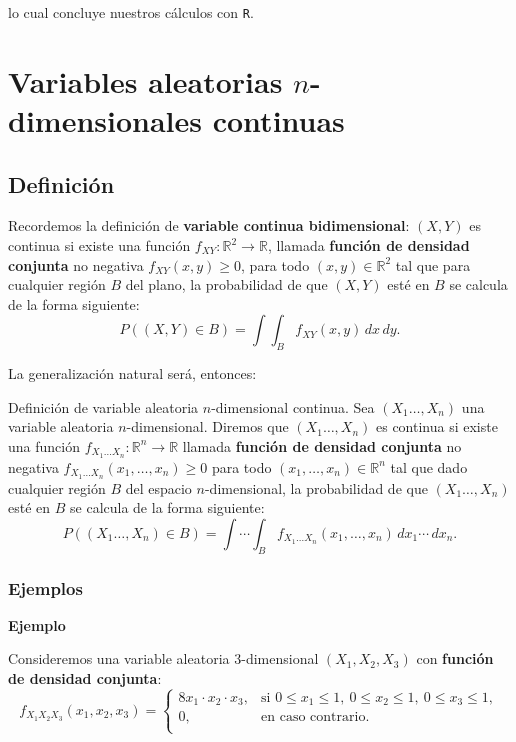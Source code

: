 \documentclass[]{book}
\begin{document}
lo cual concluye nuestros cálculos con \texttt{R}.

\hypertarget{variables-aleatorias-n-dimensionales-continuas}{%
\section{\texorpdfstring{Variables aleatorias \(n\)-dimensionales continuas}{Variables aleatorias n-dimensionales continuas}}\label{variables-aleatorias-n-dimensionales-continuas}}

\hypertarget{definiciuxf3n-7}{%
\subsection{Definición}\label{definiciuxf3n-7}}

Recordemos la definición de \textbf{variable continua bidimensional}: \((X,Y)\) es continua si existe una función \(f_{XY}:\mathbb{R}^2\longrightarrow \mathbb{R}\), llamada \textbf{función de densidad conjunta} no negativa \(f_{XY}(x,y)\geq 0\), para todo \((x,y)\in\mathbb{R}^2\) tal que para cualquier región \(B\) del plano, la probabilidad de que \((X,Y)\) esté en \(B\) se calcula de la forma siguiente:
\[
P((X,Y)\in B)=\int\int_B f_{XY}(x,y)\,dx\, dy.
\]

La generalización natural será, entonces:

Definición de variable aleatoria \(n\)-dimensional continua.
Sea \((X_1\ldots,X_n)\) una variable aleatoria \(n\)-dimensional. Diremos que \((X_1\ldots,X_n)\) es continua si existe una función
\(f_{X_1\ldots X_n}:\mathbb{R}^n\longrightarrow \mathbb{R}\) llamada \textbf{función de densidad conjunta} no negativa \(f_{X_1\ldots X_n}(x_1,\ldots,x_n)\geq 0\) para todo \((x_1,\ldots,x_n)\in\mathbb{R}^n\) tal que dado cualquier región \(B\) del espacio \(n\)-dimensional, la probabilidad de que \((X_1\ldots,X_n)\) esté en \(B\) se calcula de la forma siguiente:
\[
P((X_1\ldots,X_n)\in B)=\int\cdots\int_B f_{X_1\ldots X_n}(x_1,\ldots,x_n)\,dx_1\cdots\,dx_n.
\]

\hypertarget{ejemplos-17}{%
\subsubsection{Ejemplos}\label{ejemplos-17}}

\textbf{Ejemplo}

Consideremos una variable aleatoria \(3\)-dimensional \((X_1,X_2,X_3)\) con \textbf{función de densidad conjunta}:
\[
f_{X_1X_2X_3}(x_1,x_2,x_3)=\begin{cases}
8 x_1\cdot x_2\cdot x_3, & \mbox{si }0\leq x_1\leq 1,\ 0\leq x_2\leq 1,\ 0\leq x_3\leq 1, \\
0, & \mbox{en caso contrario.}\\
\end{cases}
\]
\end{document}

